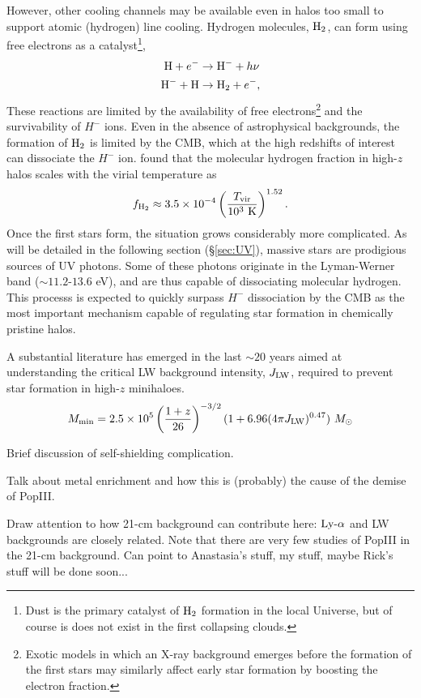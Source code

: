 However, other cooling channels may be available even in halos too small to support atomic (hydrogen) line cooling. Hydrogen molecules, $\text{H}_2$, can form using free electrons as a catalyst\footnote{Dust is the primary catalyst of $\text{H}_2$ formation in the local Universe, but of course is does not exist in the first collapsing clouds.}, 
\begin{align}
	\text{H} + e^- & \rightarrow \text{H}^- + h\nu \\
	\text{H}^- + \text{H} & \rightarrow \text{H}_2 + e^- ,
\end{align}
These reactions are limited by the availability of free electrons\footnote{
Exotic models in which an X-ray background emerges before the formation of the first stars may similarly affect early star formation by boosting the electron fraction.} and the survivability of $H^-$ ions. Even in the absence of astrophysical backgrounds, the formation of $\text{H}_2$ is limited by the CMB, which at the high redshifts of interest can dissociate the $H^-$ ion. \cite{Tegmark1997} found that the molecular hydrogen fraction in high-$z$ halos scales with the virial temperature as
\begin{equation}
	f_{\text{H}_2} \approx 3.5 \times 10^{-4} \left(\frac{T_{\text{vir}}}{10^3 \ \mathrm{K}} \right)^{1.52} .
\end{equation}
Once the first stars form, the situation grows considerably more complicated. As will be detailed in the following section (\S\ref{sec:UV}), massive stars are prodigious sources of UV photons. Some of these photons originate in the Lyman-Werner band ($\sim 11.2$-$13.6$ eV), and are thus capable of dissociating molecular hydrogen. This processs is expected to quickly surpass $H^-$ dissociation by the CMB as the most important mechanism capable of regulating star formation in chemically pristine halos. 

A substantial literature has emerged in the last $\sim 20$ years aimed at understanding the critical LW background intensity, $J_{\text{LW}}$, required to prevent star formation in high-$z$ minihaloes. 
\begin{equation}
	M_{\min} = 2.5 \times 10^5 \left(\frac{1+z}{26} \right)^{-3/2} (1 + 6.96(4\pi \JLW)^{0.47})  \ \Msun
\end{equation}

{\color{red} Brief discussion of self-shielding complication.}

{\color{red} Talk about metal enrichment and how this is (probably) the cause of the demise of PopIII.}

{\color{red} Draw attention to how 21-cm background can contribute here: $\text{Ly-}\alpha$ and LW backgrounds are closely related. Note that there are very few studies of PopIII in the 21-cm background. Can point to Anastasia's stuff, my stuff, maybe Rick's stuff will be done soon...}

